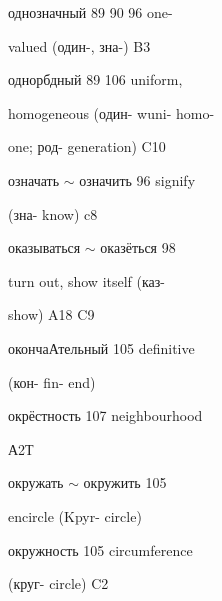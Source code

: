 \begin{minipage}[t]{0.475\textwidth}
\noindent однозначный 89 90 96 one-\par
\noindent valued (один-, зна-) B3\par
\noindent однорбдный 89 106 uniform,\par
\noindent homogeneous (один- wuni- homo-\par
\noindent one; род- generation) C10\par
\noindent означать $\sim$ означить 96 signify\par
\noindent (зна- know) c8\par
\noindent оказываться $\sim$ оказёться 98\par
\noindent turn out, show itself (каз-\par
\noindent show) A18 C9\par
\noindent окончаАтельный 105 definitive\par
\noindent (кон- fin- end)\par
\noindent окрёстность 107 neighbourhood\par
\noindent А2Т\par
\noindent окружать $\sim$ окружить 105\par
\noindent encircle (Kpyr- circle)\par
\noindent окружность 105 circumference\par
\noindent (круг- circle) C2\par
\end{minipage}\hfill

